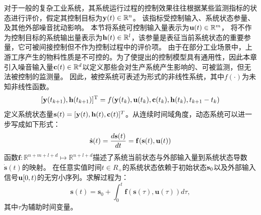 对于一般的复杂工业系统，其系统运行过程的控制效果往往根据某些监测指标的状态进行评价，假定其控制目标为$\mathbf y(t) \in \mathbb{R}^n$。
该指标受控制输入、系统状态参量、及其他外部噪音扰动影响。
本节将系统可控制输入量表示为$\mathbf u(t) \in \mathbb{R}^m$，
将不作为控制目标的系统输出量表示为$\mathbf h(t) \in \mathbb{R}^l$，该参量是表征当前系统状态的重要参量，它可被间接控制但不作为控制过程中的评价项。
由于在部分工业场景中，上游工序产生的物料性质是不可控的。为了使提出的控制模型具有通用性，因此本章引入噪音输入量$\mathbf c(t) \in\mathbb{R}^d$以定义那些会对生产系统产生影响的、可被监测，但无法被控制的监测量。
因此，被控系统可表述为形式的非线性系统，其中$f
( \cdot )$为未知非线性函数。
\begin{equation}\label{equ:system_dynamic_dt}
    [\mathbf y ( t_{k + 1} ), \mathbf h(t_{k+1})]^{\rm T} = f ( \mathbf y(t_k), \mathbf u ( t_k ) ,\mathbf c ( t_k ) ,\mathbf h(t_k), t_{k+1}-t_k)
\end{equation}
定义系统状态量$\mathbf s(t)=[\mathbf y(t), \mathbf h(t),\mathbf c(t)]^T$。从连续时间域角度，动态系统可以进一步写成如下形式：
\begin{equation}
\dot{\mathbf{s}}(t)=\frac{d \mathbf{s}(t)}{d t}=\mathbf{f}(\mathbf{s}(t), \mathbf{u}(t))
\end{equation}
函数$\mathbf{f}: \mathbb{R}^{n+m+l+d} \mapsto \mathbb{R}^{n+l+d}$描述了系统当前状态与外部输入量到系统状态导数$\boldsymbol{\dot s}(t)$的映射。
在任意实值时间$t\in R_{+}$的系统状态依赖于初始状态$\mathbf s_0$以及外部输入信号$\mathbf u[0,t)$的无穷小序列。求解过程为：
\begin{equation}
\label{equ:system_dynamic_ct}
\mathbf{s}(t)=\mathbf{s}_{0}+\int_{0}^{t} \mathbf{f}(\mathbf{s}(\tau), \mathbf{u}(\tau)) d \tau,
\end{equation}
其中$\tau$为辅助时间变量。

